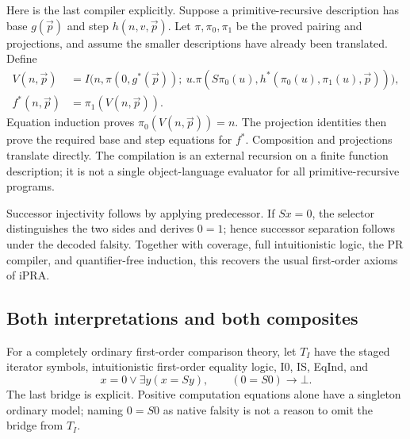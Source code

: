 \documentclass[11pt,letterpaper]{article}
\theoremstyle{definition}\newtheorem{definition}[theorem]{Definition}
\theoremstyle{remark}\newtheorem{remark}[theorem]{Remark}
\begin{document}
Here is the last compiler explicitly. Suppose a primitive-recursive
description has base $g(\vec p)$ and step $h(n,v,\vec p)$.
Let $\pi,\pi_0,\pi_1$ be the proved pairing and projections, and
assume the smaller descriptions have already been translated. Define
\begin{align*}
 V(n,\vec p)&=I\bigl(n,\pi(0,g^*(\vec p));\ u.
       \pi(S\pi_0(u),h^*(\pi_0(u),\pi_1(u),\vec p))\bigr),\\
 f^*(n,\vec p)&=\pi_1(V(n,\vec p)).
\end{align*}
Equation induction proves $\pi_0(V(n,\vec p))=n$. The projection
identities then prove the required base and step equations for $f^*$.
Composition and projections translate directly. The compilation is an
external recursion on a finite function description; it is not a single
object-language evaluator for all primitive-recursive programs.

Successor injectivity follows by applying predecessor. If $Sx=0$,
the selector distinguishes the two sides and derives $0=1$; hence
successor separation follows under the decoded falsity. Together with
coverage, full intuitionistic logic, the PR compiler, and quantifier-free
induction, this recovers the usual first-order axioms of iPRA.

\subsection{Both interpretations and both composites}

For a completely ordinary first-order comparison theory, let $T_I$
have the staged iterator symbols, intuitionistic first-order equality
logic, I0, IS, EqInd, and
\[
 x=0\vee\exists y(x=Sy),\qquad (0=S0)\to\bot.
\]
The last bridge is explicit. Positive computation equations alone have
a singleton ordinary model; naming $0=S0$ as native falsity is not a
reason to omit the bridge from $T_I$.
\end{document}
